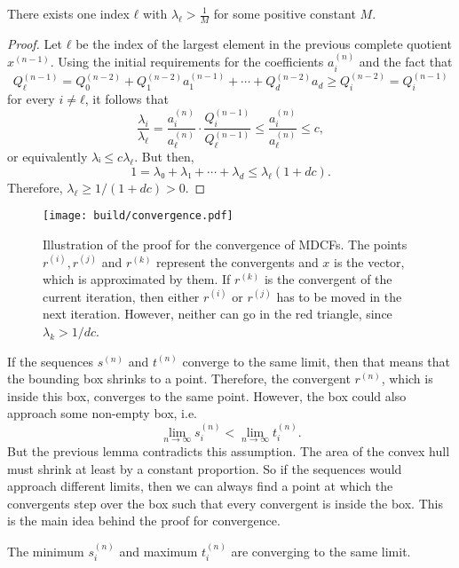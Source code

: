 \begin{lemma}
  \label{lem:lambda-pos}
  There exists one index $ℓ$ with $λ_ℓ > \frac{1}{M}$ for some positive constant $M$.
\end{lemma}

\begin{proof}
  Let $ℓ$ be the index of the largest element in the previous complete quotient $x^{(n-1)}$.
  Using the initial requirements for the coefficients $a_i^{(n)}$ and the fact
  that
  \[
    Q_ℓ^{(n-1)} = Q_0^{(n-2)} + Q_1^{(n-2)} a_1^{(n-1)} + ⋯ + Q_d^{(n-2)} a_d ≥ Q_i^{(n-2)} = Q_i^{(n-1)}
  \]
  for every $i ≠ ℓ$, it follows that
  \[
    \frac{λ_i}{λ_ℓ}
    = \frac{a_i^{(n)}}{a_ℓ^{(n)}} · \frac{Q_i^{(n-1)}}{Q_ℓ^{(n-1)}}
    ≤ \frac{a_i^{(n)}}{a_ℓ^{(n)}}
    ≤ c,
  \]
  or equivalently $λᵢ ≤ c λ_ℓ$.
  But then,
  \[
    1 = λ₀ + λ₁ + ⋯ + λ_d ≤ λ_ℓ (1 + dc).
  \]
  Therefore, $λ_ℓ ≥ 1/(1 + dc) > 0$.
\end{proof}

\begin{figure}[tbp]
  \centering
  \texttt{[image: build/convergence.pdf]}
  \caption{
    Illustration of the proof for the convergence of MDCFs.
    The points $r^{(i)}, r^{(j)}$ and $r^{(k)}$ represent the convergents and $x$ is
    the vector, which is approximated by them.
    If $r^{(k)}$ is the convergent of the current iteration,
    then either $r^{(i)}$ or $r^{(j)}$ has to be moved in the next iteration.
    However, neither can go in the red triangle,
    since $λ_k > 1/dc$.
  }
  \label{fig:convergence}
\end{figure}

If the sequences $s^{(n)}$ and $t^{(n)}$ converge to the same limit,
then that means that the bounding box shrinks to a point.
Therefore, the convergent $r^{(n)}$, which is inside this box, converges to the
same point.
However, the box could also approach some non-empty box, i.e.
\[
  \lim_{n → ∞} s_i^{(n)} < \lim_{n → ∞} t_i^{(n)}.
\]
But the previous lemma contradicts this assumption.
The area of the convex hull must shrink at least by a constant proportion.
So if the sequences would approach different limits, then we can always find a
point at which the convergents step over the box such that every convergent is
inside the box.
This is the main idea behind the proof for convergence.

\begin{lemma}
  \label{lem:min-max-conv}
  The minimum $s_i^{(n)}$ and maximum $t_i^{(n)}$ are converging to the same
  limit.
\end{lemma}

